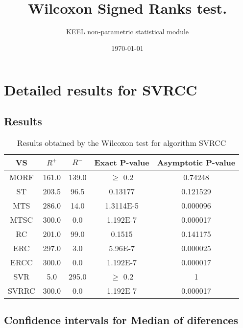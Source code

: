 \documentclass[a4paper,10pt]{article}
\title{Wilcoxon Signed Ranks test.}
\date{\today}
\author{KEEL non-parametric statistical module}
\begin{document}
\pagestyle{empty}
\maketitle
\thispagestyle{empty}



\section{Detailed results for SVRCC}


\subsection{Results}

\begin{table}[!htp]
\centering\small
\begin{tabular}{
|c|c|c|c|c|}
\hline
 VS & $R^{+}$ & $R^{-}$ & Exact P-value & Asymptotic P-value \\ \hline 
MORF & 161.0 & 139.0 & $\geq$ 0.2 & 0.74248\\ \hline 
ST & 203.5 & 96.5 & 0.13177 & 0.121529\\ \hline 
MTS & 286.0 & 14.0 & 1.3114E-5 & 0.000096\\ \hline 
MTSC & 300.0 & 0.0 & 1.192E-7 & 0.000017\\ \hline 
RC & 201.0 & 99.0 & 0.1515 & 0.141175\\ \hline 
ERC & 297.0 & 3.0 & 5.96E-7 & 0.000025\\ \hline 
ERCC & 300.0 & 0.0 & 1.192E-7 & 0.000017\\ \hline 
SVR & 5.0 & 295.0 & $\geq$ 0.2 & 1\\ \hline 
SVRRC & 300.0 & 0.0 & 1.192E-7 & 0.000017\\ \hline 

\end{tabular}
\caption{Results obtained by the Wilcoxon test for algorithm SVRCC}
\end{table}

\subsection{Confidence intervals for Median of diferences}
\end{document}
